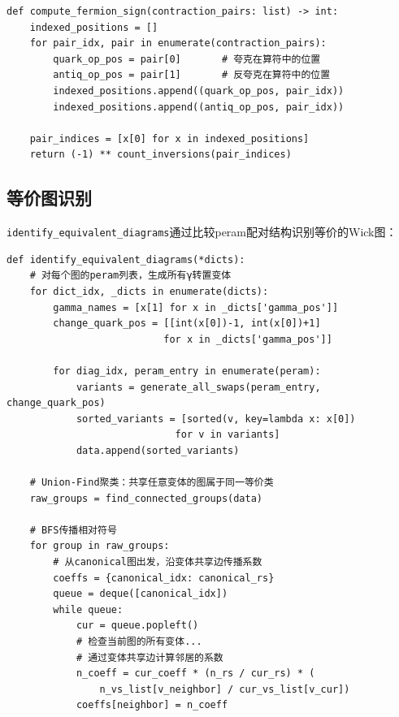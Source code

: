 \documentclass[11pt,a4paper]{ctexart}
\begin{document}
\begin{codebox}[费米子符号计算]
\begin{lstlisting}[style=python]
def compute_fermion_sign(contraction_pairs: list) -> int:
    indexed_positions = []
    for pair_idx, pair in enumerate(contraction_pairs):
        quark_op_pos = pair[0]       # 夸克在算符中的位置
        antiq_op_pos = pair[1]       # 反夸克在算符中的位置
        indexed_positions.append((quark_op_pos, pair_idx))
        indexed_positions.append((antiq_op_pos, pair_idx))

    pair_indices = [x[0] for x in indexed_positions]
    return (-1) ** count_inversions(pair_indices)
\end{lstlisting}
\end{codebox}

\subsection{等价图识别}

\texttt{identify\_equivalent\_diagrams}通过比较peram配对结构识别等价的Wick图：

\begin{codebox}[等价图识别算法]
\begin{lstlisting}[style=python]
def identify_equivalent_diagrams(*dicts):
    # 对每个图的peram列表，生成所有γ转置变体
    for dict_idx, _dicts in enumerate(dicts):
        gamma_names = [x[1] for x in _dicts['gamma_pos']]
        change_quark_pos = [[int(x[0])-1, int(x[0])+1]
                           for x in _dicts['gamma_pos']]

        for diag_idx, peram_entry in enumerate(peram):
            variants = generate_all_swaps(peram_entry, change_quark_pos)
            sorted_variants = [sorted(v, key=lambda x: x[0])
                             for v in variants]
            data.append(sorted_variants)

    # Union-Find聚类：共享任意变体的图属于同一等价类
    raw_groups = find_connected_groups(data)

    # BFS传播相对符号
    for group in raw_groups:
        # 从canonical图出发，沿变体共享边传播系数
        coeffs = {canonical_idx: canonical_rs}
        queue = deque([canonical_idx])
        while queue:
            cur = queue.popleft()
            # 检查当前图的所有变体...
            # 通过变体共享边计算邻居的系数
            n_coeff = cur_coeff * (n_rs / cur_rs) * (
                n_vs_list[v_neighbor] / cur_vs_list[v_cur])
            coeffs[neighbor] = n_coeff
\end{lstlisting}
\end{codebox}
\end{document}
